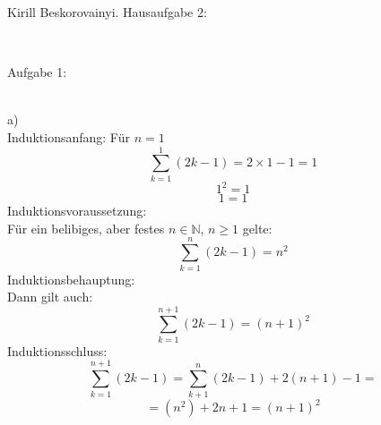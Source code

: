\documentclass[11pt]{article}
\begin{document}
	\noindent \begin{huge}Kirill Beskorovainyi. Hausaufgabe 2:\end{huge}\\\vspace{0.05in}

		\noindent \begin{Large}Aufgabe 1:\end{Large}\\[2pt]
			\indent a)\\
				Induktionsanfang: Für $n=1$
					$$\sum\limits_{k=1}^1 (2k-1)=2 \times 1 - 1 = 1$$
					$$1^2=1$$
					$$1 = 1$$
				Induktionsvoraussetzung:\\
				Für ein belibiges, aber festes $n \in \mathbb{N}$, $n \geq 1$ gelte:
					$$\sum\limits_{k=1}^n(2k-1)=n^2$$
				Induktionsbehauptung:\\
				Dann gilt auch:
				$$\sum \limits_{k=1}^{n+1}(2k-1)=(n+1)^2$$
				Induktionsschluss:\\
					$$\sum\limits_{k=1}^{n+1}(2k-1)=\sum\limits_{k+1}^{n}(2k-1)+2(n+1)-1=$$
					$$=(n^2)+2n+1 = (n+1)^2$$
\end{document}
